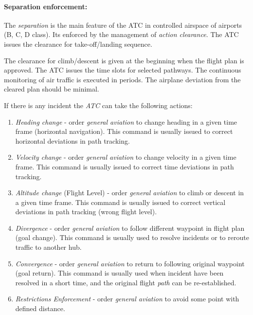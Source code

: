 \paragraph{Separation enforcement:} The \emph{separation} is the main feature of the ATC in controlled airspace of airports (B, C, D class). Its enforced by the management of \emph{action clearance}. The ATC issues the clearance for take-off/landing sequence. 

The clearance for climb/descent is given at the beginning when the flight plan is approved. The ATC issues the time slots for selected pathways. The continuous monitoring of air traffic is executed in periods. The airplane deviation from the cleared plan should be minimal. 

If there is any incident the \emph{ATC} can take the following actions:
\begin{enumerate}
    
    \item \emph{Heading change} - order \emph{general aviation} to change heading in a given time frame (horizontal navigation). This command is usually issued to correct horizontal deviations in path tracking.
    
    \item \emph{Velocity change} - order \emph{general aviation} to change velocity in a given time frame. This command is usually issued to correct time deviations in path tracking.
    
    \item \emph{Altitude change} (Flight Level) - order \emph{general aviation} to climb or descent in a given time frame. This command is usually issued to correct vertical deviations in path tracking (wrong flight level).
    
    \item \emph{Divergence} - order \emph{general aviation} to follow different waypoint in flight plan (goal change). This command is usually used to resolve incidents or to reroute traffic to another hub.
    
    \item \emph{Convergence} - order \emph{general aviation} to return to following original waypoint (goal return). This command is usually used when incident have been resolved in a short time, and the original flight \emph{path} can be re-established.
    
    \item \emph{Restrictions Enforcement} - order \emph{general aviation} to avoid some point with defined distance.  
\end{enumerate}

